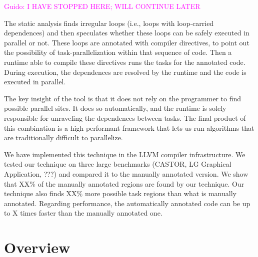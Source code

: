 \documentclass[pageno]{jpaper}
\newcommand{\guido}[1]{\noindent\textcolor{magenta}{Guido: {#1}}}
\newcommand{\guido}[1]{}
\begin{document}
\guido{I HAVE STOPPED HERE; WILL CONTINUE LATER}

The static analysis finds irregular loops (i.e., loops with loop-carried dependences) and then speculates 
whether these loops can be safely executed in parallel or not. These loops
are annotated with compiler directives, to point out the possibility of task-parallelization within that sequence of code. 
Then a runtime able to compile these directives runs the tasks for the annotated code. 
During execution, the dependences are resolved by the runtime and the code is executed in parallel. 

The key insight of the tool is that it does not rely on the programmer to find possible parallel sites. 
It does so automatically, and the runtime is solely responsible for unraveling the dependences between tasks. 
The final product of this combination is a high-performant framework that
lets us run algorithms that are traditionally difficult to parallelize.

We have implemented this technique in the LLVM compiler infrastructure. We tested our technique on three large benchmarks (CASTOR, LG Graphical Application, ???) and compared it to the manually annotated version. We show that XX\% of the manually annotated regions are found by our technique. Our technique also finds XX\% more possible task regions than what is manually annotated. Regarding performance, the automatically annotated code can be up to X times faster than the manually annotated one.



\section{Overview}
\label{sec:ovf}

\end{document}
